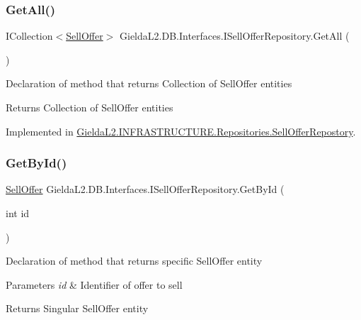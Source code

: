 \subsubsection{\texorpdfstring{GetAll()}{GetAll()}}
{\footnotesize\ttfamily I\+Collection$<$\mbox{\hyperlink{class_gielda_l2_1_1_d_b_1_1_entities_1_1_sell_offer}{Sell\+Offer}}$>$ Gielda\+L2.\+D\+B.\+Interfaces.\+I\+Sell\+Offer\+Repository.\+Get\+All (\begin{DoxyParamCaption}{ }\end{DoxyParamCaption})}



Declaration of method that returns Collection of Sell\+Offer entities 

\begin{DoxyReturn}{Returns}
Collection of Sell\+Offer entities
\end{DoxyReturn}


Implemented in \mbox{\hyperlink{class_gielda_l2_1_1_i_n_f_r_a_s_t_r_u_c_t_u_r_e_1_1_repositories_1_1_sell_offer_repostory_a1dbfc870dcfaa42e29a440635c7b30d1}{Gielda\+L2.\+I\+N\+F\+R\+A\+S\+T\+R\+U\+C\+T\+U\+R\+E.\+Repositories.\+Sell\+Offer\+Repostory}}.

\mbox{\label{interface_gielda_l2_1_1_d_b_1_1_interfaces_1_1_i_sell_offer_repository_aded9f3b24232b67af3c898689fe5d3ac}} 
\subsubsection{\texorpdfstring{GetById()}{GetById()}}
{\footnotesize\ttfamily \mbox{\hyperlink{class_gielda_l2_1_1_d_b_1_1_entities_1_1_sell_offer}{Sell\+Offer}} Gielda\+L2.\+D\+B.\+Interfaces.\+I\+Sell\+Offer\+Repository.\+Get\+By\+Id (\begin{DoxyParamCaption}\item[{int}]{id }\end{DoxyParamCaption})}



Declaration of method that returns specific Sell\+Offer entity 


\begin{DoxyParams}{Parameters}
{\em id} & Identifier of offer to sell\\
\hline
\end{DoxyParams}
\begin{DoxyReturn}{Returns}
Singular Sell\+Offer entity
\end{DoxyReturn}


